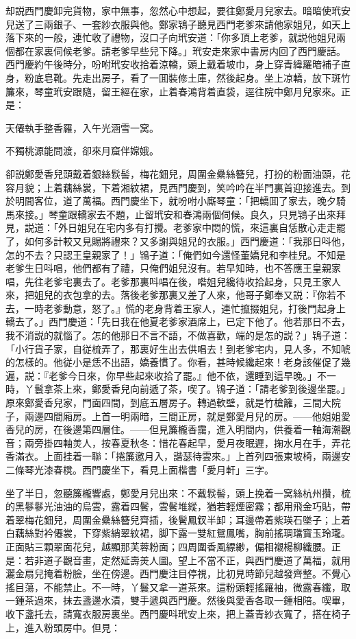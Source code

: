 却説西門慶卸完貨物，家中無事，忽然心中想起，要往鄭愛月兒家去。暗暗使玳安兒送了三兩銀子、一套紗衣服與他。鄭家鴇子聽見西門老爹來請他家姐兒，如天上落下來的一般，連忙收了禮物，沒口子向玳安道：「你多頂上老爹，就説他姐兒兩個都在家裏伺候老爹。請老爹早些兒下降。」玳安走來家中書房内回了西門慶話。西門慶約午後時分，吩咐玳安收拾着涼轎，頭上戴着坡巾，身上穿青緯羅暗補子直身，粉底皂靴。先走出房子，看了一囬裝修土庫，然後起身。坐上凉轎，放下斑竹簾來，琴童玳安跟隨，留王經在家，止着春鴻背着直袋，逕往院中鄭月兒家來。正是：

\begin{myquote}
天僊執手整香羅，入午光涵雪一窝。

不獨桃源能問渡，卻來月窟伴嫦娥。
\end{myquote}

卻説鄭愛香兒頭戴着銀絲䯼髻，梅花鈿兒，周圍金纍絲簪兒，打扮的粉面油頭，花容月貌；上着藕絲裳，下着湘紋裙，見西門慶到，笑吟吟在半門裏首迎接進去。到於明間客位，道了萬福。西門慶坐下，就吩咐小廝琴童：「把轎囬了家去，晚夕騎馬來接。」琴童跟轎家去不題，止留玳安和春鴻兩個伺候。良久，只見鴇子出來拜見，説道：「外日姐兒在宅内多有打攪。老爹家中悶的慌，來這裏自恁散心走走罷了，如何多計較又見賜將禮來？又多謝與姐兒的衣服。」西門慶道：「我那日呌他，怎的不去？只認王皇親家了！」鴇子道：「俺們如今還怪董嬌兒和李桂兒。不知是老爹生日呌唱，他們都有了禮，只俺們姐兒沒有。若早知時，也不答應王皇親家唱，先往老爹宅裏去了。老爹那裏呌唱在後，喒姐兒纔待收拾起身，只見王家人來，把姐兒的衣包拿的去。落後老爹那裏又差了人來，他哥子鄭奉又説：『你若不去，一時老爹動意，怒了。』慌的老身背着王家人，連忙攛掇姐兒，打後門起身上轎去了。」西門慶道：「先日我在他夏老爹家酒席上，已定下他了。他若那日不去，我不消説的就惱了。怎的他那日不言不語，不做喜歡，端的是怎的説？」鴇子道：「小行貨子家，自従梳弄了，那裏好生出去供唱去！到老爹宅内，見人多，不知唬的怎樣的。他従小是恁不出語，嬌養慣了。你看，甚時候纔起來！老身該催促了幾遍，説：『老爹今日來，你早些起來收拾了罷。』他不依，還睡到這早晚。」不一時，丫鬟拿茶上來，鄭愛香兒向前遞了茶，喫了。鴇子道：「請老爹到後邊坐罷。」原來鄭愛香兒家，門面四間，到底五層房子。轉過軟壁，就是竹槍籬，三間大院子，兩邊四間廂房。上首一明兩暗，三間正房，就是鄭愛月兒的房。——他姐姐愛香兒的房，在後邊第四層住。——但見簾櫳香靄，進入明間内，供養着一軸海潮觀音；兩旁掛四軸羙人，按春夏秋冬：惜花春起早，愛月夜眠遲，掬水月在手，弄花香滿衣。上面挂着一聯：「捲簾邀月入，諧瑟待雲來。」上首列四張東坡椅，兩邊安二條琴光漆春櫈。西門慶坐下，看見上面楷書「愛月軒」三字。

坐了半日，忽聽簾櫳響處，鄭愛月兒出來：不戴䯼髻，頭上挽着一窝絲杭州攢，梳的黑鬖鬖光油油的烏雲，露着四鬢，雲鬢堆縱，猶若輕煙密霧；都用飛金巧貼，帶着翠梅花鈿兒，周圍金纍絲簪兒齊插，後鬢鳳釵半卸；耳邊帶着紫瑛石墜子；上着白藕絲對衿僊裳，下穿紫綃翠紋裙，脚下露一雙紅鴛鳳嘴，胸前搖琱璫寳玉玲瓏。正面貼三顆翠面花兒，越顯那芙蓉粉面；四周圍香風縹緲，偏相襯楊柳纖腰。正是：若非道子觀音畫，定然延壽羙人圖。望上不當不正，與西門慶道了萬福，就用灑金扇兒掩着粉臉，坐在傍邊。西門慶注目停視，比初見時節兒越發齊整。不覺心搖目蕩，不能禁止。不一時，丫鬟又拿一道茶來。這粉頭輕搖羅袖，微露春纖，取一鍾茶過來，抹去盞邊水漬，雙手遞與西門慶。然後與愛香各取一鍾相陪。喫畢，收下盞托去，請寬衣服房裏坐。西門慶呌玳安上來，把上蓋青紗衣寬了，搭在椅子上，進入粉頭房中。但見：

